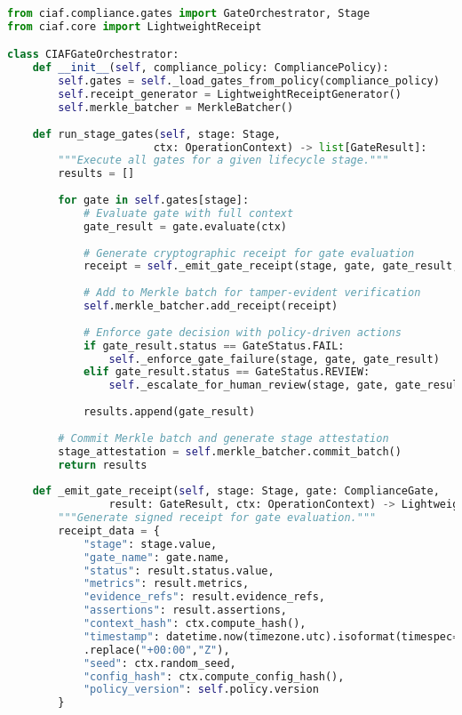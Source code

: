 \documentclass[12pt,a4paper]{article}
\begin{document}
\begin{lstlisting}[language=Python, caption=Gate Orchestrator Implementation]
from ciaf.compliance.gates import GateOrchestrator, Stage
from ciaf.core import LightweightReceipt

class CIAFGateOrchestrator:
    def __init__(self, compliance_policy: CompliancePolicy):
        self.gates = self._load_gates_from_policy(compliance_policy)
        self.receipt_generator = LightweightReceiptGenerator()
        self.merkle_batcher = MerkleBatcher()
    
    def run_stage_gates(self, stage: Stage, 
                       ctx: OperationContext) -> list[GateResult]:
        """Execute all gates for a given lifecycle stage."""
        results = []
        
        for gate in self.gates[stage]:
            # Evaluate gate with full context
            gate_result = gate.evaluate(ctx)
            
            # Generate cryptographic receipt for gate evaluation
            receipt = self._emit_gate_receipt(stage, gate, gate_result, ctx)
            
            # Add to Merkle batch for tamper-evident verification
            self.merkle_batcher.add_receipt(receipt)
            
            # Enforce gate decision with policy-driven actions
            if gate_result.status == GateStatus.FAIL:
                self._enforce_gate_failure(stage, gate, gate_result)
            elif gate_result.status == GateStatus.REVIEW:
                self._escalate_for_human_review(stage, gate, gate_result, ctx)
            
            results.append(gate_result)
        
        # Commit Merkle batch and generate stage attestation
        stage_attestation = self.merkle_batcher.commit_batch()
        return results
    
    def _emit_gate_receipt(self, stage: Stage, gate: ComplianceGate, 
                result: GateResult, ctx: OperationContext) -> LightweightReceipt:
        """Generate signed receipt for gate evaluation."""
        receipt_data = {
            "stage": stage.value,
            "gate_name": gate.name,
            "status": result.status.value,
            "metrics": result.metrics,
            "evidence_refs": result.evidence_refs,
            "assertions": result.assertions,
            "context_hash": ctx.compute_hash(),
            "timestamp": datetime.now(timezone.utc).isoformat(timespec="microseconds")
            .replace("+00:00","Z"),
            "seed": ctx.random_seed,
            "config_hash": ctx.compute_config_hash(),
            "policy_version": self.policy.version
        }
        

\end{lstlisting}
\end{document}
